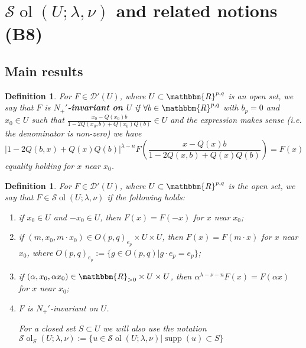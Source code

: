\documentclass{article}
\newcommand{\assign}{:=}
\newcommand{\tmop}[1]{\ensuremath{\operatorname{#1}}}
\newcommand{\tmtextbf}[1]{{\bfseries{#1}}}
\newtheorem{definition}[proposition]{Definition}
\theoremstyle{remark}
\newcommand{\D}{\mathcal{D}}
\begin{document}
\setcounter{section}{8}
\section{$\mathcal{S} \tmop{ol} (U ; \lambda, \nu)$ and related notions (B8)}\label{sec:sol}


\subsection{Main results}

\begin{definition}
  \label{def-n-nots:def-n+invar}For $F \in \D' (U)$, where $U \subset
  \mathbbm{R}^{p, q}$ is an open set, we say that $F$ is
  \tmtextbf{$N_+'$-invariant on $U$} if $\forall b \in \mathbbm{R}^{p, q}$
  with $b_p = 0$ and $x_0 \in U$ such that $\frac{x_0 - Q (x_0) b}{1 - 2 Q
  (x_0, b) + Q (x_0) Q (b)} \in U$ and the expression makes sense (i.e. the
  denominator is non-zero) we have
  \begin{equation}
    \label{eq-Nequiv} | 1 - 2 Q (b, x) + Q (x) Q (b) |^{\lambda - n} F \left(
    \frac{x - Q (x) b}{1 - 2 Q (x, b) + Q (x) Q (b)} \right) = F (x)
  \end{equation}
  equality holding for $x$ near $x_0$.
\end{definition}

\begin{definition}
  \label{sol:def-sol}For $F \in \D' (U)$, where $U \subset \mathbbm{R}^{p, q}$
  is the open set, we say that $F \in \mathcal{S} \tmop{ol} (U ; \lambda,
  \nu)$ if the following holds:
  \begin{enumerate}
    \item if $x_0 \in U$ and $- x_0 \in U$, then $F (x) = F (- x)$ for $x$
    near $x_0$;
    
    \item if $(m, x_0, m \cdot x_0) \in O (p, q)_{e_p} \times U \times U$,
    then $F (x) = F (m \cdot x)$ for $x$ near $x_0$, where $O (p, q)_{e_p}
    \assign \{g \in O (p, q) |g \cdot e_p = e_p \}$;
    
    \item if $(\alpha, x_0, \alpha x_0) \in \mathbbm{R}_{> 0} \times U \times
    U$, then $\alpha^{\lambda - \nu - n} F (x) = F (\alpha x)$ for $x$ near
    $x_0$;
    
    \item $F$ is $N_+'$-invariant on $U$.{
    
    }{
    
    }For a closed set $S \subset U$ we will also use the notation $\mathcal{S}
    \tmop{ol}_S (U ; \lambda, \nu) \assign \{ u \in \mathcal{S} \tmop{ol} (U ;
    \lambda, \nu) | \tmop{supp} (u) \subset S \}$
  \end{enumerate}
\end{definition}
\end{document}
